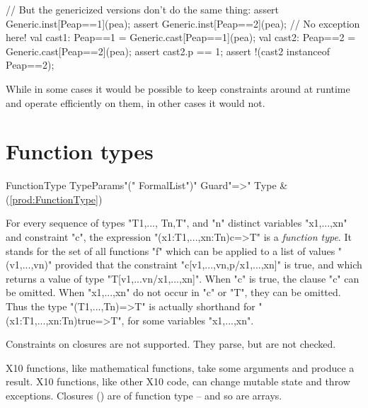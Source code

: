 \begin{ex}
\begin{xten}
{{     // But the genericized versions don't do the same thing:
     assert Generic.inst[Pea{p==1}](pea);
     assert Generic.inst[Pea{p==2}](pea);
     // No exception here!
     val cast1: Pea{p==1} = Generic.cast[Pea{p==1}](pea);
     val cast2: Pea{p==2} = Generic.cast[Pea{p==2}](pea);
     assert cast2.p == 1;
     assert !(cast2 instanceof Pea{p==2});
  }
}

\end{xten}
\end{ex}

While in some cases it would be possible to keep constraints around at runtime
and operate efficiently on them, in other cases it would not.  






\section{Function types}
\label{FunctionTypes}
\label{FunctionType}

\begin{bbgrammar}
        FunctionType \: TypeParams\opt \xcd"(" FormalList\opt \xcd")" Guard\opt \xcd"=>" Type & (\ref{prod:FunctionType}) \\
\end{bbgrammar}


For every sequence of types \xcd"T1,..., Tn,T", and \xcd"n" distinct variables
\xcd"x1,...,xn" and constraint \xcd"c", the expression
\xcd"(x1:T1,...,xn:Tn){c}=>T" is a \emph{function type}. It stands for
 the set of all functions \xcd"f" which can be applied to a
 list of values \xcd"(v1,...,vn)" provided that the constraint
 \xcd"c[v1,...,vn,p/x1,...,xn]" is true, and which returns a value of
 type \xcd"T[v1,...vn/x1,...,xn]". When \xcd"c" is true, the clause \xcd"{c}" can be
 omitted. When \xcd"x1,...,xn" do not occur in \xcd"c" or \xcd"T", they can be
 omitted. Thus the type \xcd"(T1,...,Tn)=>T" is actually shorthand for
 \xcd"(x1:T1,...,xn:Tn){true}=>T", for some variables \xcd"x1,...,xn".

\limitationx{}
Constraints on closures are not supported.  They parse, but are not checked.

X10 functions, like mathematical functions, take some arguments and produce a
result.  X10 functions, like other X10 code, can change mutable state and
throw exceptions.  Closures ()  are of function type -- and so
are arrays.


